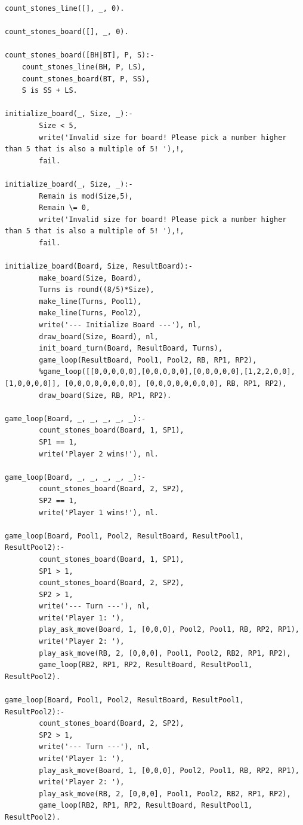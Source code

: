 \documentclass[a4paper]{article}
\begin{document}
\begin{lstlisting}
count_stones_line([], _, 0).

count_stones_board([], _, 0).
    
count_stones_board([BH|BT], P, S):-
    count_stones_line(BH, P, LS),
    count_stones_board(BT, P, SS),
    S is SS + LS.

initialize_board(_, Size, _):- 
        Size < 5,
        write('Invalid size for board! Please pick a number higher than 5 that is also a multiple of 5! '),!,
        fail.

initialize_board(_, Size, _):- 
        Remain is mod(Size,5),
        Remain \= 0,
        write('Invalid size for board! Please pick a number higher than 5 that is also a multiple of 5! '),!,
        fail.

initialize_board(Board, Size, ResultBoard):- 
        make_board(Size, Board),
        Turns is round((8/5)*Size),
        make_line(Turns, Pool1),
        make_line(Turns, Pool2),
        write('--- Initialize Board ---'), nl,
        draw_board(Size, Board), nl,
        init_board_turn(Board, ResultBoard, Turns),
        game_loop(ResultBoard, Pool1, Pool2, RB, RP1, RP2),
        %game_loop([[0,0,0,0,0],[0,0,0,0,0],[0,0,0,0,0],[1,2,2,0,0],[1,0,0,0,0]], [0,0,0,0,0,0,0,0], [0,0,0,0,0,0,0,0], RB, RP1, RP2),
        draw_board(Size, RB, RP1, RP2).

game_loop(Board, _, _, _, _, _):-
        count_stones_board(Board, 1, SP1),
        SP1 == 1,
        write('Player 2 wins!'), nl.

game_loop(Board, _, _, _, _, _):-
        count_stones_board(Board, 2, SP2),
        SP2 == 1,
        write('Player 1 wins!'), nl.

game_loop(Board, Pool1, Pool2, ResultBoard, ResultPool1, ResultPool2):-  
        count_stones_board(Board, 1, SP1),
        SP1 > 1,
        count_stones_board(Board, 2, SP2),
        SP2 > 1,
        write('--- Turn ---'), nl,
        write('Player 1: '),
        play_ask_move(Board, 1, [0,0,0], Pool2, Pool1, RB, RP2, RP1),
        write('Player 2: '),
        play_ask_move(RB, 2, [0,0,0], Pool1, Pool2, RB2, RP1, RP2),
        game_loop(RB2, RP1, RP2, ResultBoard, ResultPool1, ResultPool2).

game_loop(Board, Pool1, Pool2, ResultBoard, ResultPool1, ResultPool2):- 
        count_stones_board(Board, 2, SP2),
        SP2 > 1,
        write('--- Turn ---'), nl,
        write('Player 1: '),
        play_ask_move(Board, 1, [0,0,0], Pool2, Pool1, RB, RP2, RP1),
        write('Player 2: '),
        play_ask_move(RB, 2, [0,0,0], Pool1, Pool2, RB2, RP1, RP2),
        game_loop(RB2, RP1, RP2, ResultBoard, ResultPool1, ResultPool2).


\end{lstlisting}
\end{document}
